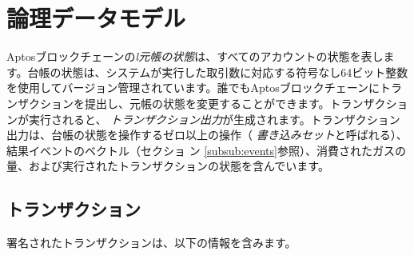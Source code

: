 \documentclass{article}
\begin{document}
\section{論理データモデル}
\label{sec:logical}

Aptosブロックチェーンの\emph{l元帳の状態}は、すべてのアカウントの状態を表します。台帳の状態は、システムが実行した取引数に対応する符号なし64ビット整数を使用してバージョン管理されています。誰でもAptosブロックチェーンにトランザクションを提出し、元帳の状態を変更することができます。トランザクションが実行されると、 \emph{トランザクション出力}が生成されます。トランザクション出力は、台帳の状態を操作するゼロ以上の操作（ \emph{書き込みセット}と呼ばれる）、結果イベントのベクトル（セクショ ン \ref{subsub:events}参照）、消費されたガスの量、および実行されたトランザクションの状態を含んでいます。

\subsection{トランザクション}

署名されたトランザクションは、以下の情報を含みます。
\end{document}
